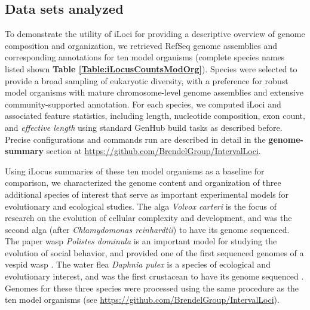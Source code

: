 \subsection{Data sets analyzed}
To demonstrate the utility of iLoci for providing a descriptive overview of genome composition and organization, we retrieved RefSeq genome assemblies and corresponding annotations for ten model organisms (complete species names listed shown \textbf{Table \ref{Table:iLocusCountsModOrg}}).
Species were selected to provide a broad sampling of eukaryotic diversity, with a preference for robust model organisms with mature chromosome-level genome assemblies and extensive community-supported annotation.
For each species, we computed iLoci and associated feature statistics, including length, nucleotide composition, exon count, and \textit{effective length} using standard GenHub build tasks as described before.
Precise configurations and commands run are described in detail in the \textbf{genome-summary} section at \url{https://github.com/BrendelGroup/IntervalLoci}.

Using iLocus summaries of these ten model organisms as a baseline for comparison, we characterized the genome content and organization of three additional species of interest that serve as important experimental models for evolutionary and ecological studies.
The alga \textit{Volvox carteri} is the focus of research on the evolution of cellular complexity and development, and was the second alga (after \textit{Chlamydomonas reinhardtii}) to have its genome sequenced.
The paper wasp \textit{Polistes dominula} is an important model for studying the evolution of social behavior, and provided one of the first sequenced genomes of a vespid wasp \cite{PdomGenome}.
The water flea \textit{Daphnia pulex} is a species of ecological and evolutionary interest, and was the first crustacean to have its genome sequenced \cite{DaphniaGenome}.
Genomes for these three species were processed using the same procedure as the ten model organisms (see \url{https://github.com/BrendelGroup/IntervalLoci}).


